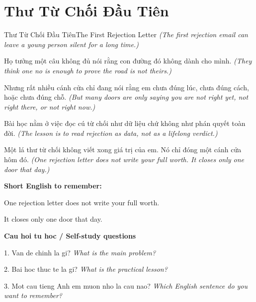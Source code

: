 \section{Thư Từ Chối Đầu Tiên}
\begin{truyen}{Thư Từ Chối Đầu Tiên}{The First Rejection Letter}
\textit{(The first rejection email can leave a young person silent for a long time.)}

Họ tưởng một câu không đủ nói rằng con đường đó không dành cho mình.
\textit{(They think one no is enough to prove the road is not theirs.)}

Nhưng rất nhiều cánh cửa chỉ đang nói rằng em chưa đúng lúc, chưa đúng cách, hoặc chưa đúng chỗ.
\textit{(But many doors are only saying you are not right yet, not right there, or not right now.)}

Bài học nằm ở việc đọc cú từ chối như dữ liệu chứ không như phán quyết toàn đời.
\textit{(The lesson is to read rejection as data, not as a lifelong verdict.)}

\end{truyen}

\begin{baihoc}
Một lá thư từ chối không viết xong giá trị của em. Nó chỉ đóng một cánh cửa hôm đó.
\textit{(One rejection letter does not write your full worth. It closes only one door that day.)}
\end{baihoc}

\begin{ghinhoanh}
\textbf{Short English to remember:}

One rejection letter does not write your full worth.

It closes only one door that day.

\end{ghinhoanh}

\begin{tuhocnhanh}
\textbf{Cau hoi tu hoc / Self-study questions}

1. Van de chinh la gi? \textit{What is the main problem?}

2. Bai hoc thuc te la gi? \textit{What is the practical lesson?}

3. Mot cau tieng Anh em muon nho la cau nao? \textit{Which English sentence do you want to remember?}
\end{tuhocnhanh}
\ngancach

